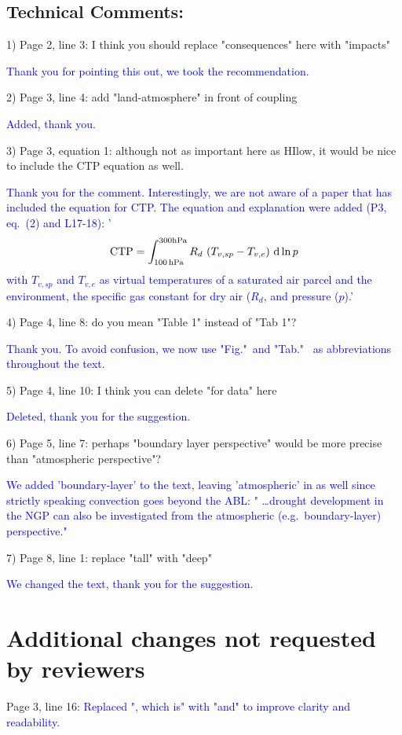 \documentclass[hess, manuscript]{copernicus}
\def\TG{\textcolor{blue}}
\begin{document}
\subsection{Technical Comments:}  

1) Page 2, line 3:  I think you should replace "consequences"
here with "impacts"

\TG{Thank you for pointing this out, we took the recommendation.}

2) Page 3, line 4: add "land-atmosphere" in front of coupling

\TG{Added, thank you.}

3) Page 3, equation 1:  although not as important here as HIlow, it would be nice to include the CTP equation as well.

\TG{Thank you for the comment. Interestingly, we are not aware of a paper that has included the equation for CTP. The equation and explanation were added (P3, eq.~(2) and L17-18): '
\begin{equation}
\mathrm{CTP} = \int_{100\,{\rm hPa}}^{300{\rm hPa}} R_d\,\left(T_{v,sp}-T_{v,e}\right)\,\mathrm{d\,ln}\,p
\end{equation}
with $T_{v,sp}$ and $T_{v,e}$ as virtual temperatures of a saturated air parcel and the environment, the specific gas constant for dry air ($R_d$, and pressure ($p$).'
}

4) Page 4, line 8: do you mean "Table 1" instead of "Tab 1"?

\TG{Thank you. To avoid confusion, we now use "Fig."~and "Tab."~ as abbreviations throughout the text.}

5) Page 4, line 10: I think you can delete "for data" here

\TG{Deleted, thank you for the suggestion. }

6) Page 5, line 7:  perhaps "boundary layer perspective" would be more precise than "atmospheric perspective"?

\TG{We added 'boundary-layer' to the text, leaving 'atmospheric' in as well since strictly speaking convection goes beyond the ABL: " \ldots drought development in the NGP can also be investigated from the atmospheric (e.g.~boundary-layer) perspective."}

7) Page 8, line 1: replace "tall" with "deep"

\TG{We changed the text, thank you for the suggestion.}

\section{Additional changes not requested by reviewers}

Page 3, line 16: \TG{Replaced ", which is" with "and" to improve clarity and readability.} 
\end{document}
